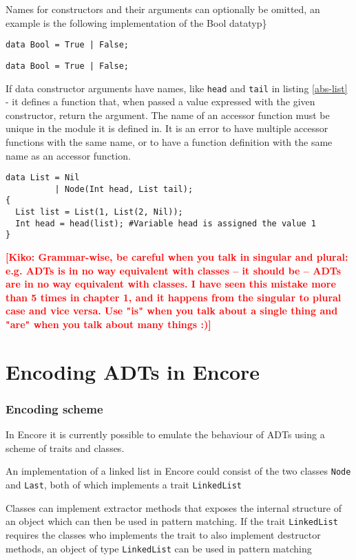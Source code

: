 \documentclass[10pt]{report}
\newcommand{\KIKO}[1]{\textcolor{red}{\textbf{[Kiko: #1]}}}
\def\code#1{\texttt{#1}} %
\begin{document}
\par{Names for constructors and their arguments can optionally be omitted, an example is the following implementation of the Bool datatyp\}

\begin{lstlisting}[language=encore,caption={Actual definition of built-in type Bool},label=test-kiko]
data Bool = True | False;
\end{lstlisting}

\begin{lstlisting}[language=encore,caption={Actual definition of built-in type Bool}]
data Bool = True | False;
\end{lstlisting}
\par{If data constructor arguments have names, like \code{head} and \code{tail} in listing \ref{abs-list} - it defines a function that, when passed a value expressed with the given constructor, return the argument.  The name of an accessor function must be unique in the module it is defined in. It is an error to have multiple accessor functions with the same name, or to have a function definition with the same name as an accessor function.}

\begin{lstlisting}[language=encore,caption={Accessor funtion in ABS},label=abs-list]
data List = Nil
          | Node(Int head, List tail);
{
  List list = List(1, List(2, Nil));
  Int head = head(list); #Variable head is assigned the value 1
}
\end{lstlisting}


\KIKO{Grammar-wise, be careful when you talk in singular and plural: e.g. ADTs is in no way equivalent with classes -- it should be -- ADTs are in no way equivalent with classes. I have seen this mistake more than
5 times in chapter 1, and it happens from the singular to plural case and vice versa. Use "is" when you talk about a single thing and "are" when you talk about many things :)}

\chapter{Encoding ADTs in Encore}
\subsection{Encoding scheme}
\par{In Encore it is currently possible to emulate the behaviour of ADTs using a scheme of traits and classes.}\cite{gustavL}%
\par{An implementation of a linked list in Encore could consist of the two classes \code{Node} and \code{Last}, both of which implements a trait \code{LinkedList}}
\par{Classes can implement extractor methods that exposes the internal structure of an object which can then be used in pattern matching. If the trait \code{LinkedList} requires the classes who implements the trait to also implement destructor methods, an object of type \code{LinkedList} can be used in pattern matching}

}
\end{document}
